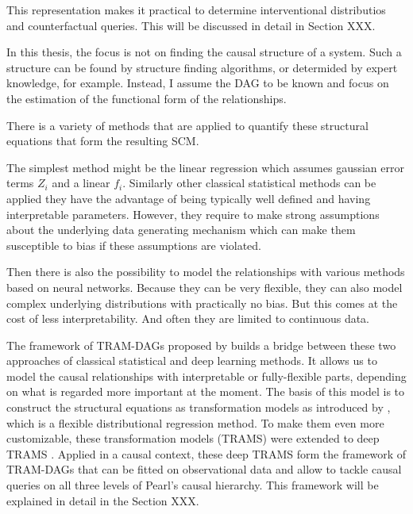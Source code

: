 This representation makes it practical to determine interventional distributios and counterfactual queries. This will be discussed in detail in Section XXX.

In this thesis, the focus is not on finding the causal structure of a system. Such a structure can be found by structure finding algorithms, or determided by expert knowledge, for example. Instead, I assume the DAG to be known and focus on the estimation of the functional form of the relationships.

There is a variety of methods that are applied to quantify these structural equations that form the resulting SCM. 

% 


The simplest method might be the linear regression which assumes gaussian error terms $Z_i$ and a linear $f_i$. Similarly other classical statistical methods can be applied they have the advantage of being typically well defined and having interpretable parameters. However, they require to make strong assumptions about the underlying data generating mechanism which can make them susceptible to bias if these assumptions are violated.

Then there is also the possibility to model the relationships with various methods based on neural networks. Because they can be very flexible, they can also model complex underlying distributions with practically no bias. But this comes at the cost of less interpretability. And often they are limited to continuous data.

The framework of TRAM-DAGs proposed by \citet{sick2025} builds a bridge between these two approaches of classical statistical and deep learning methods. It allows us to model the causal relationships with interpretable or fully-flexible parts, depending on what is regarded more important at the moment. The basis of this model is to construct the structural equations as transformation models as introduced by \citet{hothorn2014}, which is a flexible distributional regression method. To make them even more customizable, these transformation models (TRAMS) were extended to deep TRAMS \citep{sick2020}. Applied in a causal context, these deep TRAMS form the framework of TRAM-DAGs that can be fitted on observational data and allow to tackle causal queries on all three levels of Pearl's causal hierarchy. This framework will be explained in detail in the Section XXX.



